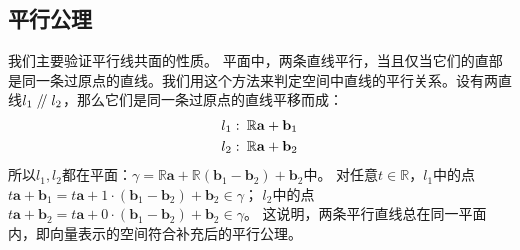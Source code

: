 \documentclass[12pt,UTF8]{ctexbook}
\renewcommand\parallel{\mathrel{/\mskip-4mu/}}
\begin{document}
\begin{appendix}
\section{平行公理}
我们主要验证平行线共面的性质。
平面中，两条直线平行，当且仅当它们的直部是同一条过原点的直线。我们用这个方法来判定空间中直线的平行关系。设有两直线$l_1\parallel l_2$，那么它们是同一条过原点的直线平移而成：
\begin{align}
l_1: & \,\,\, \mathbb{R}\mathbf{a} + \mathbf{b}_1 \notag \\
l_2: & \,\,\, \mathbb{R}\mathbf{a} + \mathbf{b}_2\notag
\end{align}
所以$l_1,l_2$都在平面：$\gamma = \mathbb{R}\mathbf{a} + \mathbb{R}(\mathbf{b}_1 - \mathbf{b}_2) + \mathbf{b}_2$中。
对任意$t\in\mathbb{R}$，$l_1$中的点$t\mathbf{a} + \mathbf{b}_1 = t\mathbf{a} + 1\cdot(\mathbf{b}_1 - \mathbf{b}_2) + \mathbf{b}_2 \in \gamma$；
$l_2$中的点$t\mathbf{a} + \mathbf{b}_2 = t\mathbf{a} + 0\cdot(\mathbf{b}_1 - \mathbf{b}_2) + \mathbf{b}_2 \in \gamma$。
这说明，两条平行直线总在同一平面内，即向量表示的空间符合补充后的平行公理。

\end{appendix}






\end{document}
